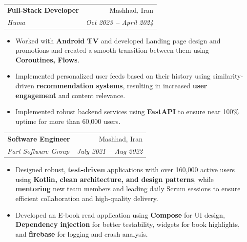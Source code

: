 \documentclass[letterpaper,12pt]{article}
\makeatletter
\newcommand{\resumeItem}[1]{
  \item\small{
    {#1 \vspace{-2pt}}
  }
}
\newcommand{\resumeSubheading}[4]{
  \vspace{-2pt}\item
    \begin{tabular*}{0.97\textwidth}[t]{l@{\extracolsep{\fill}}r}
      \textbf{#1} & #2 \\
      \textit{\small#3} & \textit{\small #4} \\
    \end{tabular*}\vspace{-7pt}
}
\newcommand{\resumeItemListStart}{\begin{itemize}}
\newcommand{\resumeItemListEnd}{\end{itemize}\vspace{-5pt}}
\makeatother
\begin{document}
\resumeSubheading
      {Full-Stack Developer}{Mashhad, Iran}
      {Huma}{Oct 2023 \textbf{--} April 2024 }
        \resumeItemListStart
            \resumeItem{Worked with\textbf{ Android TV} and developed Landing page design and promotions and created a smooth transition between them using \textbf{Coroutines, Flows}.}
            \resumeItem{Implemented personalized user feeds based on their history using similarity-driven \textbf{recommendation systems}, resulting in increased \textbf{user engagement} and content relevance.
            }
            \resumeItem{Implemented robust backend services using \textbf{FastAPI} to ensure near 100\% uptime for more than 60,000 users.}
                        
        \resumeItemListEnd
        

                        
    

    
    \resumeSubheading
      {Software Engineer}{Mashhad, Iran}
      {Part Software Group}{July 2021 \textbf{--} Aug 2022}
        \resumeItemListStart
        \resumeItem{Designed robust, \textbf{test-driven} applications with over 160,000 active users using \textbf{Kotlin, clean architecture, and design patterns}, while \textbf{mentoring} new team members and leading daily Scrum sessions to ensure efficient collaboration and high-quality delivery.}
        \resumeItem{Developed an E-book read application using \textbf{Compose }for UI design, \textbf{Dependency injection} for better testability, widgets for book highlights, and \textbf{firebase} for logging and crash analysis.}
        \resumeItemListEnd
    
\end{document}
